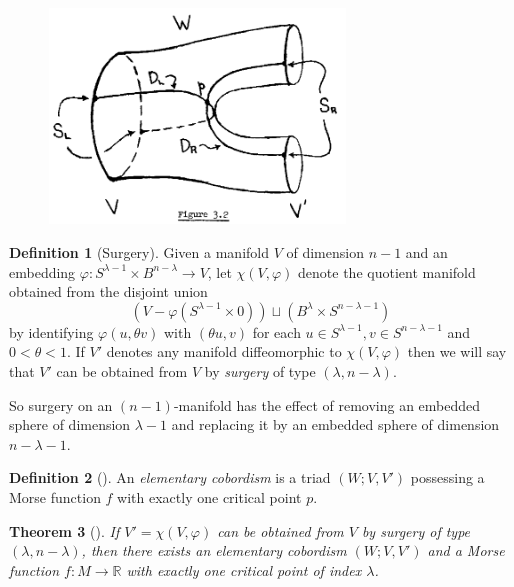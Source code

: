 \documentclass[reqno]{amsart}
\newtheorem{theorem}{Theorem}[section]
\theoremstyle{definition}
\newtheorem{definition}[theorem]{Definition}
\theoremstyle{remark}
\begin{document}
\begin{figure}[htpb]
    \centering
    \includegraphics[width=0.7\textwidth]{fig3-2.png}
    \label{fig:fig3-2-png}
\end{figure}



\begin{definition}[Surgery]
    Given a manifold $V$ of dimension $n-1$ and
    an embedding $\varphi  \colon S^{\lambda - 1}\times 
    B^{n-\lambda} \to V$, let
    $\chi (V, \varphi )$ denote the quotient manifold obtained
    from the disjoint union
    \[
        \left( V - \varphi \left( S^{\lambda-1}\times 0 \right) 
        \right) \sqcup \left( B^{\lambda} \times 
        S^{n-\lambda-1} \right) 
    \] 
    by identifying $\varphi (u, \theta v)$ with
    $\left( \theta u, v \right) $ for
    each $u \in S^{\lambda-1}, v \in S^{n-\lambda-1}$ and
    $0 < \theta < 1$. If
    $V'$ denotes any manifold diffeomorphic to
    $\chi (V, \varphi )$ then we will say that
    $V'$ can be obtained from $V$ by \textit{surgery} of
    type $\left( \lambda, n-\lambda \right) $.
\end{definition}


So surgery on an $(n-1)$-manifold has the effect
of removing an embedded sphere of dimension $\lambda-1$ 
and replacing it by an embedded sphere of dimension
$n - \lambda - 1$.

   \begin{definition}[]
       An \textit{elementary cobordism} is a triad
       $\left( W; V, V' \right) $ possessing a Morse
       function $f$ with exactly one critical point
       $p$.
   \end{definition}


\begin{theorem}[]
    If $V' = \chi (V, \varphi )$ can be obtained from
    $V$ by surgery of type $\left( \lambda, n-\lambda
    \right) $, then there exists an elementary cobordism
    $\left( W; V,V' \right) $ and a Morse function
    $f \colon M \to \mathbb{R}$ with
    exactly one critical point of index $\lambda$.
\end{theorem}
\end{document}
